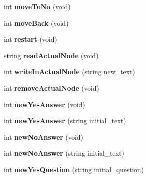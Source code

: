 \begin{DoxyCompactItemize}
\item 
int {\bfseries move\+To\+No} (void)\hypertarget{classGameEngine_aef22044b8c728d648f4b0d478276c028}{}\label{classGameEngine_aef22044b8c728d648f4b0d478276c028}

\item 
int {\bfseries move\+Back} (void)\hypertarget{classGameEngine_ad5980e20974bf0f3b5adc9f1de0434ee}{}\label{classGameEngine_ad5980e20974bf0f3b5adc9f1de0434ee}

\item 
int {\bfseries restart} (void)\hypertarget{classGameEngine_ab54d6b668a506e746d432157cc611240}{}\label{classGameEngine_ab54d6b668a506e746d432157cc611240}

\item 
string {\bfseries read\+Actual\+Node} (void)\hypertarget{classGameEngine_ab0ccbeccb193bcade16938be6a6a388f}{}\label{classGameEngine_ab0ccbeccb193bcade16938be6a6a388f}

\item 
int {\bfseries write\+In\+Actual\+Node} (string new\+\_\+text)\hypertarget{classGameEngine_a7c0c3494620ea427d232875ec6ac5314}{}\label{classGameEngine_a7c0c3494620ea427d232875ec6ac5314}

\item 
int {\bfseries remove\+Actual\+Node} (void)\hypertarget{classGameEngine_a17f5e4446691b4b49946aa5246e9c745}{}\label{classGameEngine_a17f5e4446691b4b49946aa5246e9c745}

\item 
int {\bfseries new\+Yes\+Answer} (void)\hypertarget{classGameEngine_a60f59ad9d986518c2b02395e1141762c}{}\label{classGameEngine_a60f59ad9d986518c2b02395e1141762c}

\item 
int {\bfseries new\+Yes\+Answer} (string initial\+\_\+text)\hypertarget{classGameEngine_aa9ffb7adbdb70bdd8b443969a016c4be}{}\label{classGameEngine_aa9ffb7adbdb70bdd8b443969a016c4be}

\item 
int {\bfseries new\+No\+Answer} (void)\hypertarget{classGameEngine_af56b409af16473edc6c8e8fac73f251c}{}\label{classGameEngine_af56b409af16473edc6c8e8fac73f251c}

\item 
int {\bfseries new\+No\+Answer} (string initial\+\_\+text)\hypertarget{classGameEngine_ad3f74526d6de45dd90dbb3e4f6e3807e}{}\label{classGameEngine_ad3f74526d6de45dd90dbb3e4f6e3807e}

\item 
int {\bfseries new\+Yes\+Question} (string initial\+\_\+question)\hypertarget{classGameEngine_a3a21ccb76962cf94f932b3f837d7977f}{}\label{classGameEngine_a3a21ccb76962cf94f932b3f837d7977f}


\end{DoxyCompactItemize}
